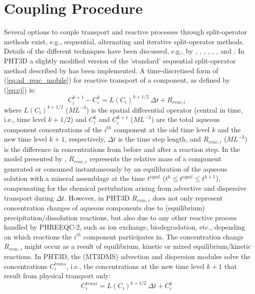 \section{Coupling Procedure}
\label{sec:coupling} Several options to couple transport and
reactive processes through split-ope\-ra\-tor methods exist, e.g.,
sequential, alternating and iterative split-operator methods.
Details of the different techniques have been discussed, e.g., by
\cite{herzer89}, \cite{val92}, \cite{miller93}, \cite{phdzysset},
\cite{zysset94_2}, \cite{morka95_1,morka95_2}, \cite{steefel96}
and \cite{barry96,barry97,barry2002}. In PHT3D a slightly modified
version of the 'standard' sequential split-operator method
described by \cite{walt94a} has been implemented. A
time-discretised form of (\ref{eq:ad_reac_mobile}) for reactive
transport of a component, as defined by (\ref{eq:cj}) is:
\begin{equation}
C_i^{k+1} - C_i^k = L(C_i)^{k+1/2} \ \Delta t + R_{reac,i}\
\label{eq:ss_discretinorg}
\end{equation}
where $L(C_i)^{k+1/2}$ ($ML^{-3}$) is the spatial differential
operator (central in time, i.e., time level $k+1/2$) and $C_i^k$
and $C_i^{k+1}$ ($ML^{-3}$) are the total aqueous component
concentrations of the $i^{th}$ component at the old time level $k$
and the new time level $k+1$, respectively, $\Delta t$ is the time
step length, and $R_{reac,i}$ ($ML^{-3}$) is the difference in
concentrations from before and after a reaction step. In the model
presented by \cite{walt94a}, $R_{reac,i}$ represents the relative
mass of a component generated or consumed instantaneously by an
equilibration of the aqueous solution with a mineral assemblage at
the time $t^{equil}$ ($t^k \le t^{equil} \le t^{k+1}$),
compensating for the chemical pertubation arising from advective
and dispersive transport during $\Delta t$. However, in PHT3D
$R_{reac,i}$ does not only represent concentration changes of
aqueous components due to (equilibrium) precipitation/dissolution
reactions, but also due to any other reactive process handled by
PHREEQC-2, such as ion exchange, biodegradation, etc., depending
on which reactions the $i^{th}$ component participates in. The
concentration change $R_{reac,i}$ might occur as a result of
equilibrium, kinetic or mixed equilibrium/kinetic reactions. In
PHT3D, the (MT3DMS) advection and dispersion modules solve the
concentrations $C_i^{trans}$, i.e., the concentrations at the new
time level $k+1$ that result from physical transport only:
\begin{equation}
C_i^{trans} = L(C_i)^{k+1/2} \ \Delta t + C_i^k\ \label{eq:seq_1}
\end{equation}
